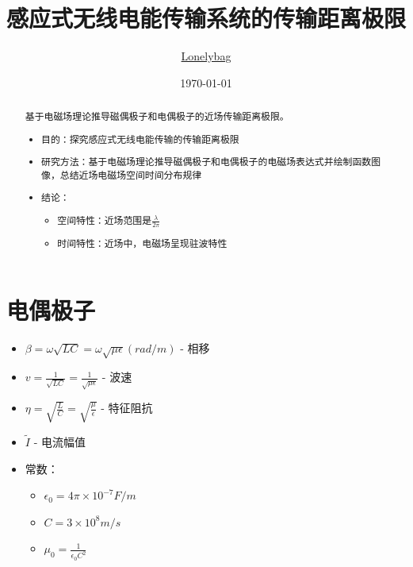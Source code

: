 \documentclass[lang=cn,11pt]{elegantpaper}
\title{感应式无线电能传输系统的传输距离极限}
\author{\href{https://gitee.com/lonelybag/personal-doc/}{Lonelybag}}
\date{\today}
\begin{document}
\maketitle

\begin{abstract}
  基于电磁场理论推导磁偶极子和电偶极子的近场传输距离极限。
  \begin{itemize}
    \item 目的：探究感应式无线电能传输的传输距离极限
    \item 研究方法：基于电磁场理论推导磁偶极子和电偶极子的电磁场表达式并绘制函数图像，总结近场电磁场空间时间分布规律
    \item 结论：
    \begin{itemize}
      \item 空间特性：近场范围是$\frac{\lambda}{2\pi}$
      \item 时间特性：近场中，电磁场呈现驻波特性
    \end{itemize}
  \end{itemize}

\end{abstract}

\section{电偶极子}
\begin{itemize}
  \item $\beta=\omega\sqrt{LC}=\omega\sqrt{\mu\epsilon}(rad/m)$ - 相移
  \item $v=\frac{1}{\sqrt{LC}}=\frac{1}{\sqrt{\mu \epsilon}}$ - 波速
  \item $\eta=\sqrt{\frac{L}{C}}=\sqrt{\frac{\mu}{\epsilon}}$ - 特征阻抗
  \item $\widetilde{I}$ - 电流幅值
  \item 常数：
  \begin{itemize}
    \item ${\epsilon}_0=4\pi \times 10^{-7} F / m$
    \item $C = 3 \times 10^8 m/s$
    \item ${\mu}_0 = \frac{1}{{\epsilon}_0 C^2}$ 
  \end{itemize}
  
\end{itemize}
\end{document}
